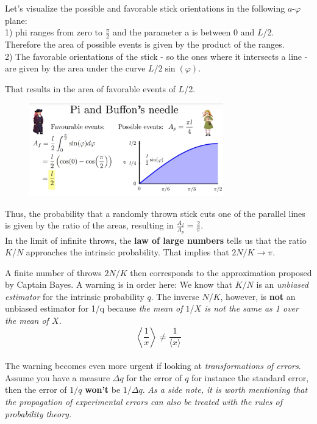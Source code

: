 \documentclass[12pt, a4paper]{scrartcl}
\begin{document}
Let’s visualize the possible and favorable stick orientations in the following
$a$-$\varphi$ plane:\\
1) phi ranges from zero to $\frac{\pi}{2}$ and the parameter a is between 0 and
$L$/2. Therefore the area of possible events is given by the product of
the ranges.\\%
2) The favorable orientations of the stick - so the ones where it intersects a line - are
given by the area under the curve $L/2\sin(\varphi)$.%

That results in the area of favorable events of $L$/2.\\%
 \begin{figure}[H]
	\centering
	\includegraphics[width=0.75\textwidth]{9_2.png}
\end{figure}

Thus, the probability that a randomly thrown stick cuts one of the parallel
lines is given by the ratio of the areas, resulting in $\frac{A_f}{A_p}=\frac{2}{\pi}$.\\%

In the limit of infinite throws, the  \textbf{law of large numbers} tells us that the ratio $K$/$N$ approaches the intrinsic probability.
That implies that $2N/K \rightarrow \pi$.

A finite number of throws $2N/K$ then corresponds to the approximation proposed by Captain Bayes. A warning is in order here: We know that
$K/N$ is an \textit{unbiased estimator} for the intrinsic probability $q$. The inverse
$N/K$, however, is  \textbf{not} an unbiased estimator for 1/q because \textit{the mean of $1/X$ is not the same as 1 over the mean of $X$.}
\begin{equation*}\boxed{\left\langle \frac 1x \right\rangle \neq \frac{1}{\langle x\rangle}
}\end{equation*}\\

The warning becomes even more urgent if looking at \textit{transformations
of errors}. Assume you have a measure $\Delta q$ for the error of $q$ for instance the standard
error, then the error of $1/q$
\textbf{won't} be $1/\Delta q$.
\textit{As a side note, it is worth mentioning that the propagation of experimental errors can also be treated with the rules of probability theory.}\\
\end{document}
